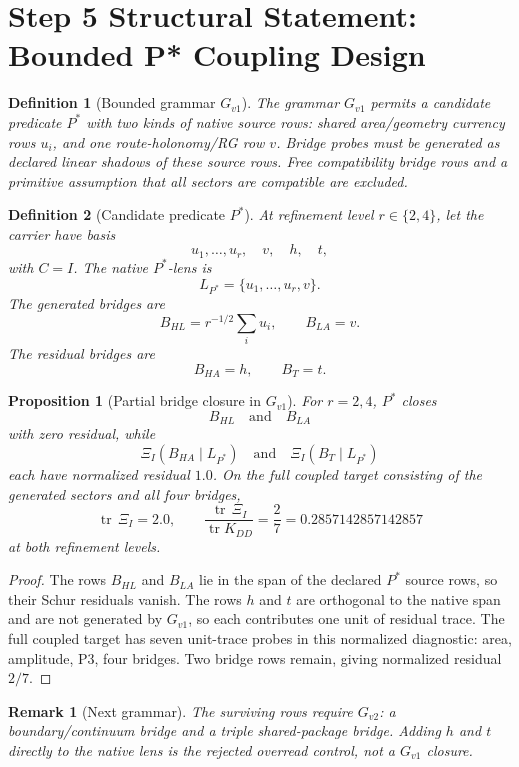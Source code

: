 \documentclass[11pt]{article}
\newtheorem{definition}{Definition}
\newtheorem{proposition}{Proposition}
\newtheorem{remark}{Remark}
\DeclareMathOperator{\tr}{tr}
\begin{document}
\section*{Step 5 Structural Statement: Bounded P* Coupling Design}

\begin{definition}[Bounded grammar \(G_{v1}\)]
The grammar \(G_{v1}\) permits a candidate predicate \(P^*\) with two kinds of
native source rows: shared area/geometry currency rows \(u_i\), and one
route-holonomy/RG row \(v\).  Bridge probes must be generated as declared
linear shadows of these source rows.  Free compatibility bridge rows and a
primitive assumption that all sectors are compatible are excluded.
\end{definition}

\begin{definition}[Candidate predicate \(P^*\)]
At refinement level \(r\in\{2,4\}\), let the carrier have basis
\[
  u_1,\ldots,u_r,\quad v,\quad h,\quad t,
\]
with \(C=I\).  The native \(P^*\)-lens is
\[
  L_{P^*}=\{u_1,\ldots,u_r,v\}.
\]
The generated bridges are
\[
  B_{HL}=r^{-1/2}\sum_i u_i,\qquad B_{LA}=v.
\]
The residual bridges are
\[
  B_{HA}=h,\qquad B_T=t.
\]
\end{definition}

\begin{proposition}[Partial bridge closure in \(G_{v1}\)]
For \(r=2,4\), \(P^*\) closes
\[
  B_{HL}\quad\text{and}\quad B_{LA}
\]
with zero residual, while
\[
  \Xi_I(B_{HA}\mid L_{P^*})\quad\text{and}\quad
  \Xi_I(B_T\mid L_{P^*})
\]
each have normalized residual \(1.0\).  On the full coupled target consisting
of the generated sectors and all four bridges,
\[
  \tr\,\Xi_I=2.0,\qquad
  \frac{\tr\,\Xi_I}{\tr K_{DD}}=\frac{2}{7}=0.2857142857142857
\]
at both refinement levels.
\end{proposition}

\begin{proof}
The rows \(B_{HL}\) and \(B_{LA}\) lie in the span of the declared \(P^*\)
source rows, so their Schur residuals vanish.  The rows \(h\) and \(t\) are
orthogonal to the native span and are not generated by \(G_{v1}\), so each
contributes one unit of residual trace.  The full coupled target has seven
unit-trace probes in this normalized diagnostic: area, amplitude, P3, four
bridges.  Two bridge rows remain, giving normalized residual \(2/7\).
\end{proof}

\begin{remark}[Next grammar]
The surviving rows require \(G_{v2}\): a boundary/continuum bridge and a
triple shared-package bridge.  Adding \(h\) and \(t\) directly to the native
lens is the rejected overread control, not a \(G_{v1}\) closure.
\end{remark}
\end{document}
